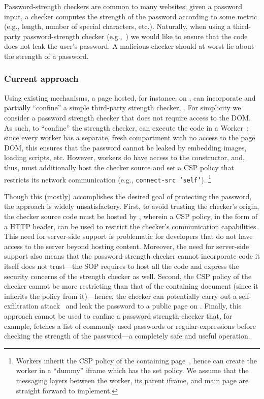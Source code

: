 Password-strength checkers are common to many websites;
%
given a password input, a checker computes the strength of the
password according to some metric (e.g., length, number of special
characters, etc.).
%
Naturally, when using a third-party password-strength checker
(e.g.,~\cite{checker1}) we would like to ensure that the
code does not leak the user's password.
%
A malicious checker should at worst lie about the strength of a
password.

\subsubsection{Current approach}
%
Using existing mechanisms, a page hosted, for instance, on
, can incorporate and partially ``confine'' a
simple third-party strength checker, .
%
For simplicity we consider a password strength checker that does not
require access to the DOM.
%
As such, to ``confine'' the strength checker, 
can execute the code in a Worker~\cite{workers};
%
since every worker has a separate, fresh compartment with no
access to the page DOM, this ensures that the password cannot be
leaked by embedding images, loading scripts, etc.
%
However, workers do have access to the \xhr{} constructor, and, thus,
 must additionally host the checker source and set
a CSP policy that restricts its network communication (e.g.,
\texttt{connect-src 'self'}).
\footnote{
  Workers inherit the CSP policy of the containing page~\cite{csp},
  hence  can create the worker in a ``dummy''
  iframe which has the set policy.
  We assume that the messaging layers between the worker, its parent
  iframe, and main page are straight forward to implement.
}
%

Though this (mostly) accomplishes the desired goal of
protecting the password, the approach is widely unsatisfactory.
%
First, to avoid trusting the checker's origin, the checker source code
must be hosted by , wherein a CSP policy, in the
form of a HTTP  header, can be used to restrict the checker's
communication capabilities. 
%
This need for server-side support is problematic for developers that
do not have access to the server beyond hosting content.
%
Moreover, the need for server-side support also means that the
password-strength checker cannot incorporate code it itself does not
trust---the SOP requires  to host all the code
and express the security concerns of the strength checker as well.
%
Second, the CSP policy of the checker cannot be more restricting than
that of the containing document (since it inherits the policy from
it)---hence, the checker can potentially carry out a self-exfiltration
attack~\cite{selfex} and leak the password to a public
page on .
%
Finally, this approach cannot be used to confine a password
strength-checker that, for example, fetches a list of commonly used
passwords or regular-expressions before checking the strength of the
password---a completely safe and useful operation.
%

